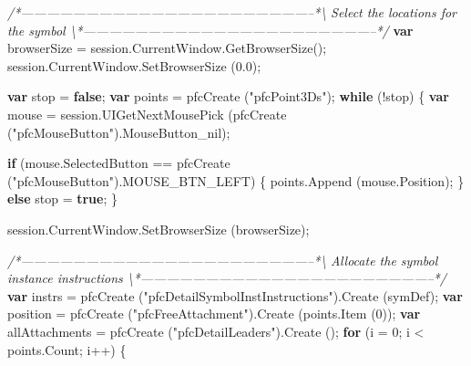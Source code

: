 \documentclass[]{article}
\newenvironment{Shaded}{}{}
\newcommand{\KeywordTok}[1]{\textcolor[rgb]{0.00,0.44,0.13}{\textbf{{#1}}}}
\newcommand{\DecValTok}[1]{\textcolor[rgb]{0.25,0.63,0.44}{{#1}}}
\newcommand{\FloatTok}[1]{\textcolor[rgb]{0.25,0.63,0.44}{{#1}}}
\newcommand{\StringTok}[1]{\textcolor[rgb]{0.25,0.44,0.63}{{#1}}}
\newcommand{\CommentTok}[1]{\textcolor[rgb]{0.38,0.63,0.69}{\textit{{#1}}}}
\newcommand{\OtherTok}[1]{\textcolor[rgb]{0.00,0.44,0.13}{{#1}}}
\newcommand{\FunctionTok}[1]{\textcolor[rgb]{0.02,0.16,0.49}{{#1}}}
\newcommand{\NormalTok}[1]{{#1}}
\begin{document}
\begin{Shaded}
\begin{Highlighting}[]
\CommentTok{/*--------------------------------------------------------------------*\textbackslash{} }
\CommentTok{  Select the locations for the symbol}
\CommentTok{\textbackslash{}*--------------------------------------------------------------------*/}
  \KeywordTok{var} \NormalTok{browserSize = }\OtherTok{session}\NormalTok{.}\OtherTok{CurrentWindow}\NormalTok{.}\FunctionTok{GetBrowserSize}\NormalTok{();}
  \OtherTok{session}\NormalTok{.}\OtherTok{CurrentWindow}\NormalTok{.}\FunctionTok{SetBrowserSize} \NormalTok{(}\FloatTok{0.0}\NormalTok{);}
  
  \KeywordTok{var} \NormalTok{stop = }\KeywordTok{false}\NormalTok{;}
  \KeywordTok{var} \NormalTok{points = }\FunctionTok{pfcCreate} \NormalTok{(}\StringTok{"pfcPoint3Ds"}\NormalTok{);}
  \KeywordTok{while} \NormalTok{(!stop)}
    \NormalTok{\{}
      \KeywordTok{var} \NormalTok{mouse = }
    \OtherTok{session}\NormalTok{.}\FunctionTok{UIGetNextMousePick} \NormalTok{(}\FunctionTok{pfcCreate} \NormalTok{(}\StringTok{"pfcMouseButton"}\NormalTok{).}\FunctionTok{MouseButton_nil}\NormalTok{);}
      
      \KeywordTok{if} \NormalTok{(}\OtherTok{mouse}\NormalTok{.}\FunctionTok{SelectedButton} \NormalTok{== }
      \FunctionTok{pfcCreate} \NormalTok{(}\StringTok{"pfcMouseButton"}\NormalTok{).}\FunctionTok{MOUSE_BTN_LEFT}\NormalTok{)}
    \NormalTok{\{}
      \OtherTok{points}\NormalTok{.}\FunctionTok{Append} \NormalTok{(}\OtherTok{mouse}\NormalTok{.}\FunctionTok{Position}\NormalTok{);}
    \NormalTok{\}}
      \KeywordTok{else}
    \NormalTok{stop = }\KeywordTok{true}\NormalTok{;}
    \NormalTok{\}}
  
  \OtherTok{session}\NormalTok{.}\OtherTok{CurrentWindow}\NormalTok{.}\FunctionTok{SetBrowserSize} \NormalTok{(browserSize);}
 
\CommentTok{/*--------------------------------------------------------------------*\textbackslash{}  }
\CommentTok{  Allocate the symbol instance instructions }
\CommentTok{\textbackslash{}*--------------------------------------------------------------------*/} 
  \KeywordTok{var} \NormalTok{instrs = }
    \FunctionTok{pfcCreate} \NormalTok{(}\StringTok{"pfcDetailSymbolInstInstructions"}\NormalTok{).}\FunctionTok{Create} \NormalTok{(symDef); }
  \KeywordTok{var} \NormalTok{position = }\FunctionTok{pfcCreate} \NormalTok{(}\StringTok{"pfcFreeAttachment"}\NormalTok{).}\FunctionTok{Create} \NormalTok{(}\OtherTok{points}\NormalTok{.}\FunctionTok{Item} \NormalTok{(}\DecValTok{0}\NormalTok{));}
  \KeywordTok{var} \NormalTok{allAttachments = }\FunctionTok{pfcCreate} \NormalTok{(}\StringTok{"pfcDetailLeaders"}\NormalTok{).}\FunctionTok{Create} \NormalTok{();    }
  \KeywordTok{for} \NormalTok{(i = }\DecValTok{0}\NormalTok{; i < }\OtherTok{points}\NormalTok{.}\FunctionTok{Count}\NormalTok{; i++)}
    \NormalTok{\{}
      

\end{Highlighting}
\end{Shaded}
\end{document}
